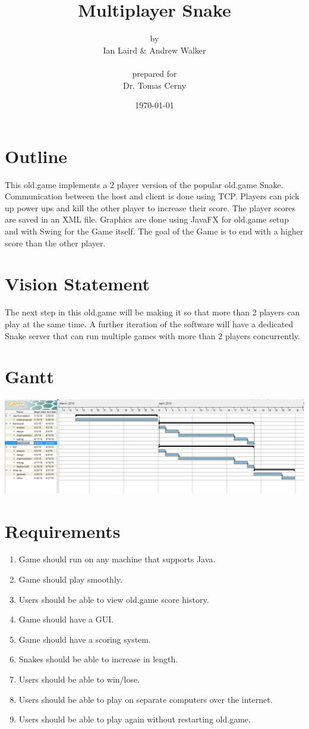 \documentclass[titlepage]{article}
\title{{\Huge Multiplayer Snake}\\\vspace{3mm}{\large Software Engineering 1 \& Intro to Java}}
\date{\today}
\author{{\normalsize by}\\{\large Ian Laird \& Andrew Walker}\\ \\ {\normalsize prepared for}\\Dr. Tomas Cerny}
\begin{document}
	\maketitle
	\section{Outline}
	This old.game implements a 2 player version of the popular old.game Snake. Communication between the host and client is done using TCP. Players can pick up power ups and kill the other player to increase their score. The player scores are saved in an XML file. Graphics are done using JavaFX for old.game setup and with Swing for the Game itself. The goal of the Game is to end with a higher score than the other player.

	\section{Vision Statement}
	The next step in this old.game will be making it so that more than 2 players can play at the same time. A further iteration of the software will have a dedicated Snake server that can run multiple games with more than 2 players concurrently.
	
	\section{Gantt}
	\includegraphics[scale=.50]{gantt2}
	
	\section{Requirements}
	\begin{enumerate}
		\item Game should run on any machine that supports Java.
		\item Game should play smoothly.
		\item Users should be able to view old.game score history.
		\item Game should have a GUI.
		\item Game should have a scoring system.
		\item Snakes should be able to increase in length.
		\item Users should be able to win/lose.
		\item Users should be able to play on separate computers over the internet.
		\item Users should be able to play again without restarting old.game.
	\end{enumerate}
	
\end{document}
